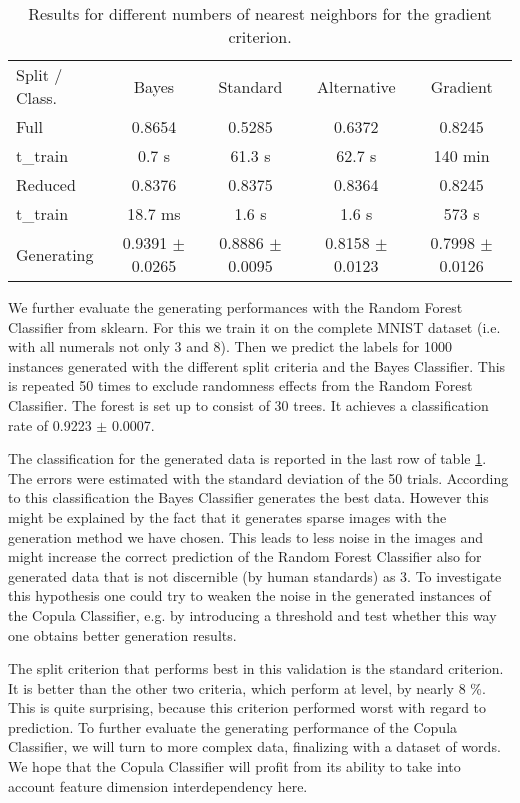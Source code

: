 \documentclass[draft]{article}
\begin{document}
\begin{table}[h]
	\centering
	\begin{tabular}{l c c c c}
		Split / Class.&	Bayes 	& Standard	& Alternative 	& Gradient	\\
		Full		&	0.8654	&	0.5285	&	0.6372		& 0.8245	\\
	 	t\_train	&   0.7 s	&	61.3 s	&	62.7 s		& 140 min	\\
		Reduced 	& 	0.8376	&	0.8375	&	0.8364		& 0.8245	\\
		t\_train	&   18.7 ms	&	1.6 s	&   1.6 s		& 573 s		\\
   		Generating	& 	0.9391 $\pm$ 0.0265	&	0.8886 $\pm$ 0.0095		& 0.8158 $\pm$ 0.0123 & 0.7998 $\pm$ 0.0126 \\
	\end{tabular}
	\caption{Results for different numbers of nearest neighbors for the gradient criterion.}
	\label{tab5}
\end{table}

We further evaluate the generating performances with the Random Forest Classifier from sklearn.
For this we train it on the complete MNIST dataset (i.e. with all numerals not only 3 and 8).
Then we predict the labels for 1000 instances generated with the different split criteria and 
the Bayes Classifier. This is repeated 50 times to exclude randomness effects from the Random Forest Classifier.
The forest is set up to consist of 30 trees.
It achieves a classification rate of 0.9223 $\pm$ 0.0007.
\iftrue
The classification for the generated data is reported in the last row of table \ref{tab5}. 
The errors were estimated with the standard deviation of the 50 trials.
\newline
According to this classification the Bayes Classifier generates the best data. However this might
be explained by the fact that it generates sparse images with the generation method we have chosen.
This leads to less noise in the images and might increase the correct prediction of the Random Forest Classifier 
also for generated data that is not discernible (by human standards) as 3.
To investigate this hypothesis one could try to weaken the noise in the generated instances of the Copula Classifier,
e.g. by introducing a threshold and test whether this way one obtains better generation results.
\fi
\newline
The split criterion that performs best in this validation is the standard criterion.
It is better than the other two criteria, which perform at level, by nearly 8 \%.
This is quite surprising, because this criterion performed worst with regard to prediction.
\newline
To further evaluate the generating performance of the Copula Classifier, we will turn to more complex data,
finalizing with a dataset of words. We hope that the Copula Classifier will profit from its ability to take into 
account feature dimension interdependency here.
\end{document}
